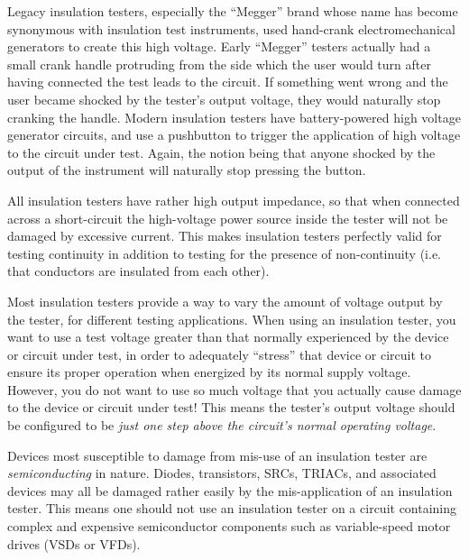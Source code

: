 Legacy insulation testers, especially the ``Megger'' brand whose name has become synonymous with insulation test instruments, used hand-crank electromechanical generators to create this high voltage.  Early ``Megger'' testers actually had a small crank handle protruding from the side which the user would turn after having connected the test leads to the circuit.  If something went wrong and the user became shocked by the tester's output voltage, they would naturally stop cranking the handle.  Modern insulation testers have battery-powered high voltage generator circuits, and use a pushbutton to trigger the application of high voltage to the circuit under test.  Again, the notion being that anyone shocked by the output of the instrument will naturally stop pressing the button.

All insulation testers have rather high output impedance, so that when connected across a short-circuit the high-voltage power source inside the tester will not be damaged by excessive current.  This makes insulation testers perfectly valid for testing continuity in addition to testing for the presence of non-continuity (i.e. that conductors are insulated from each other).

\vskip 10pt

Most insulation testers provide a way to vary the amount of voltage output by the tester, for different testing applications.  When using an insulation tester, you want to use a test voltage greater than that normally experienced by the device or circuit under test, in order to adequately ``stress'' that device or circuit to ensure its proper operation when energized by its normal supply voltage.  However, you do not want to use so much voltage that you actually cause damage to the device or circuit under test!  This means the tester's output voltage should be configured to be {\it just one step above the circuit's normal operating voltage}.

Devices most susceptible to damage from mis-use of an insulation tester are {\it semiconducting} in nature.  Diodes, transistors, SRCs, TRIACs, and associated devices may all be damaged rather easily by the mis-application of an insulation tester.  This means one should not use an insulation tester on a circuit containing complex and expensive semiconductor components such as variable-speed motor drives (VSDs or VFDs).  








\vfil \eject

